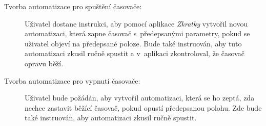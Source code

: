 \begin{description}
\item[Tvorba automatizace pro spuštění časovače:] Uživatel dostane instrukci, aby pomocí aplikace \emph{Zkratky} vytvořil novou automatizaci, která zapne časovač s~předepsanými parametry, pokud se uživatel objeví na předepsané poloze. Bude také instruován, aby tuto automatizaci zkusil ručně spustit a v~aplikaci zkontroloval, že časovač opravu běží.
\item[Tvorba automatizace pro vypnutí časovače:] Uživatel bude požádán, aby vytvořil automatizaci, která se ho zeptá, zda nechce zastavit běžící časovač, pokud opustí předepsanou polohu. Zde bude také instruován, aby automatizaci zkusil ručně spustit.
\end{description}

